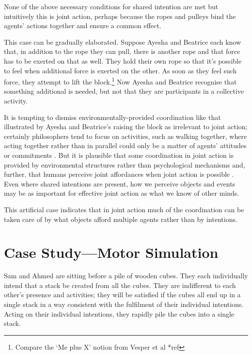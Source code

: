 \documentclass[12pt,a4paper]{extarticle}
\begin{document}
None of the above necessary conditions for shared intention are met but intuitively this is joint action, perhaps because the ropes and pulleys bind the agents' actions together and ensure a common effect.  

This case can be gradually elaborated.  Suppose Ayesha and Beatrice each know that, in addition to the rope they can pull, there is another rope and that force has to be exerted on that as well.  They hold their own rope so that it's possible to feel when additional force is exerted on the other.  As soon as they feel such force, they attempt to lift the block.\footnote{
Compare the `Me plus X' notion from Vesper et al *ref
} 
Now Ayesha and Beatrice recognise that something additional is needed, but not that they are participants in a collective activity.  



It is tempting to dismiss environmentally-provided coordination like that illustrated by Ayesha and Beatrice's raising the block as irrelevant to joint action; certainly philosophers tend to focus on activities, such as walking together, where acting together rather than in parallel could only be a matter of agents' attitudes or commitments \citep[e.g.][]{gilbert_walking_1990}.  But it is plausible that some coordination in joint action is provided by environmental structures rather than psychological mechanisms and, further, that humans perceive joint affordances when joint action is possible \citep{richardson_judging_2007}.  Even where shared intentions are present, how we perceive objects and events may be as important for effective joint action as what we know of other minds.

This artificial case indicates that in joint action much of the coordination can be taken care of by what objects afford multiple agents rather than by intentions. 


\section{Case Study---Motor Simulation}

Sam and Ahmed are sitting before a pile of wooden cubes.  They each individually intend that a stack be created from all the cubes.  They are indifferent to each other's presence and activities; they will be satisfied if the cubes all end up in a single stack in a way consistent with the fulfilment of their individual intentions.  Acting on their individual intentions, they rapidly pile the cubes into a single stack.
\end{document}
